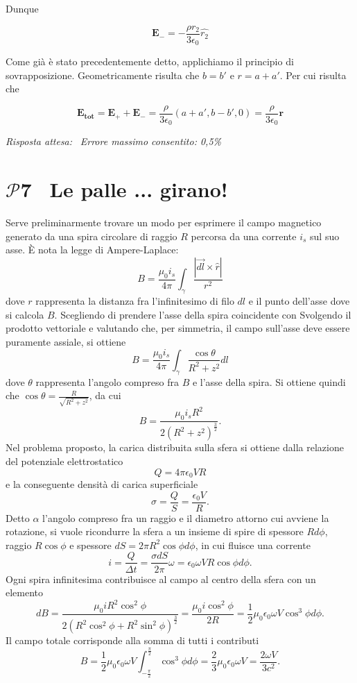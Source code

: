 \documentclass[a4paper,12pt]{article}
\newcommand{\problemtitle}[1]{
  \noindent
  \textbf{\Large #1}\hspace{0.5em}
  \raisebox{0.6ex}{\rule{\linewidth - \widthof{\textbf{\Large #1}} - 0.6em}{0.4pt}}%
}
\begin{document}
\noindent Dunque

\[
\mathbf{E_-}=-\frac{\rho r_2}{3 \epsilon_0}\hat{r_2}
\]

\noindent Come già è stato precedentemente detto, applichiamo il principio di sovrapposizione. Geometricamente risulta che $b=b'$ e $ r=a+a'$. Per cui risulta che 

\[
\mathbf{E_{tot}}=\mathbf{E_+} + \mathbf{E_-}=\frac{\rho}{3\epsilon_0}(a+a',b-b',0)=\frac{\rho}{3\epsilon_0}\mathbf{r}
\]

\textit{Risposta attesa:}  \, \textit{Errore massimo consentito: 0,5\%}


\section*{\problemtitle{$\mathcal{P}${\small{7}} \, Le palle ... girano!}}
Serve preliminarmente trovare un modo per esprimere il campo magnetico generato da una spira circolare di raggio $R$ percorsa da una corrente $i_s$ sul suo asse. È nota la legge di Ampere-Laplace:
\[
B = \frac{\mu_0 i_s}{4\pi} \int_\gamma \frac{|\vec{dl} \times \hat{r}|}{r^2}
\]
dove $r$ rappresenta la distanza fra l'infinitesimo di filo $dl$ e il punto dell'asse dove si calcola $B$. Scegliendo di prendere l'asse della spira coincidente con Svolgendo il prodotto vettoriale e valutando che, per simmetria, il campo sull'asse deve essere puramente assiale, si ottiene
\[
B = \frac{\mu_0 i_s}{4\pi} \int_\gamma \frac{\cos\theta }{R^2 + z^2} dl
\]
dove $\theta$ rappresenta l'angolo compreso fra $B$ e l'asse della spira. Si ottiene quindi che $\cos \theta = \frac{R}{\sqrt{R^2 +z^2}}$, da cui
\[
B = \frac{\mu_0 i_s R^2}{2(R^2+z^2)^{\frac{3}{2}}}.
\]
Nel problema proposto, la carica distribuita sulla sfera si ottiene dalla relazione del potenziale elettrostatico
\[
Q = 4\pi\epsilon_0 VR
\]
e la conseguente densità di carica superficiale 
\[
\sigma = \frac{Q}{S} = \frac{\epsilon_0 V}{R}.
\]
Detto $\alpha$ l'angolo compreso fra un raggio e il diametro attorno cui avviene la rotazione, si vuole ricondurre la sfera a un insieme di spire di spessore $Rd\phi$, raggio $R\cos\phi$ e spessore $dS = 2 \pi R^2 \cos \phi d\phi$, in cui fluisce una corrente 
\[
i = \frac{Q}{\Delta t} = \frac{\sigma dS}{2\pi}\omega = \epsilon_0 \omega VR  \cos\phi d\phi.
\]
Ogni spira infinitesima contribuisce al campo al centro della sfera con un elemento 
\[
dB = \frac{\mu_0 i R^2\cos^2\phi}{2(R^2\cos^2\phi+R^2\sin^2\phi)^{\frac{3}{2}}} = \frac{\mu_0 i \cos^2 \phi}{2R} = \frac{1}{2}\mu_0 \epsilon_0 \omega V  \cos^3\phi d\phi.
\]
Il campo totale corrisponde alla somma di tutti i contributi 
\[
B = \frac{1}{2}\mu_0 \epsilon_0 \omega V \int_{-\frac{\pi}{2}}^{\frac{\pi}{2}}  \cos^3\phi d\phi = \frac{2}{3}\mu_0 \epsilon_0 \omega V = \frac{2\omega V}{3c^2}.
\]
\end{document}
